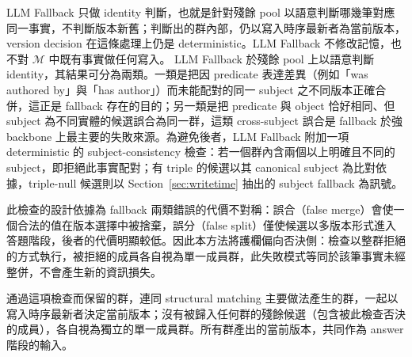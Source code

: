 LLM Fallback 只做 identity 判斷，也就是針對殘餘 pool 以語意判斷哪幾筆對應同一事實，不判斷版本新舊；判斷出的群內部，仍以寫入時序最新者為當前版本，version decision 在這條處理上仍是 deterministic。LLM Fallback 不修改記憶，也不對 $\mathcal{M}$ 中既有事實做任何寫入。
LLM Fallback 於殘餘 pool 上以語意判斷 identity，其結果可分為兩類。一類是把因 predicate 表達差異（例如「was authored by」與「has author」）而未能配對的同一 subject 之不同版本正確合併，這正是 fallback 存在的目的；另一類是把 predicate 與 object 恰好相同、但 subject 為不同實體的候選誤合為同一群，這類 cross-subject 誤合是 fallback 於強 backbone 上最主要的失敗來源。為避免後者，LLM Fallback 附加一項 deterministic 的 subject-consistency 檢查：若一個群內含兩個以上明確且不同的 subject，即拒絕此事實配對；有 triple 的候選以其 canonical subject 為比對依據，triple-null 候選則以 Section~\ref{sec:writetime} 抽出的 subject fallback 為訊號。

此檢查的設計依據為 fallback 兩類錯誤的代價不對稱：誤合（false merge）會使一個合法的值在版本選擇中被捨棄，誤分（false split）僅使候選以多版本形式進入答題階段，後者的代價明顯較低。因此本方法將護欄偏向否決側：檢查以整群拒絕的方式執行，被拒絕的成員各自視為單一成員群，此失敗模式等同於該筆事實未經整併，不會產生新的資訊損失。

通過這項檢查而保留的群，連同 structural matching 主要做法產生的群，一起以寫入時序最新者決定當前版本；沒有被歸入任何群的殘餘候選（包含被此檢查否決的成員），各自視為獨立的單一成員群。所有群產出的當前版本，共同作為 answer 階段的輸入。
